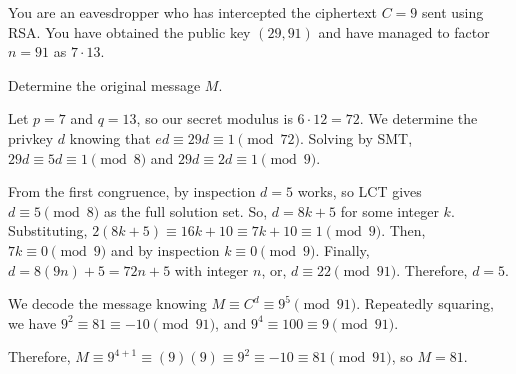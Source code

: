\documentclass{agony}
\begin{document}
\begin{prob}
  You are an eavesdropper who has intercepted the ciphertext $C = 9$ sent using RSA\@.
  You have obtained the public key $(29, 91)$ and have managed to factor $n = 91$ as $7 \cdot 13$.

  Determine the original message $M$.
\end{prob}
\begin{sol}
  Let $p = 7$ and $q = 13$, so our secret modulus is $6 \cdot 12 = 72$.
  We determine the privkey $d$ knowing that $ed \equiv 29d \equiv 1 \pmod{72}$.
  Solving by SMT, $29d \equiv 5d \equiv 1 \pmod{8}$ and $29d \equiv 2d \equiv 1 \pmod{9}$.

  From the first congruence, by inspection $d=5$ works, so LCT gives $d\equiv 5 \pmod 8$ as the full solution set. So, $d = 8k + 5$ for some integer $k$.
  Substituting, $2(8k + 5) \equiv 16k + 10 \equiv 7k + 10 \equiv 1 \pmod{9}$.
  Then, $7k \equiv 0 \pmod{9}$ and by inspection $k \equiv 0 \pmod{9}$.
  Finally, $d = 8(9n) + 5 = 72n + 5$ with integer $n$, or, $d \equiv 22 \pmod{91}$.
  Therefore, $d = 5$.

  We decode the message knowing $M \equiv C^d \equiv 9^{5} \pmod{91}$.
  Repeatedly squaring, we have $9^2 \equiv 81 \equiv -10 \pmod{91}$, and $9^4 \equiv 100 \equiv 9 \pmod{91}$.

  Therefore, $M \equiv 9^{4+1} \equiv (9)(9) \equiv 9^2 \equiv -10 \equiv 81 \pmod{91}$, so $M = 81$.
\end{sol}
\end{document}
